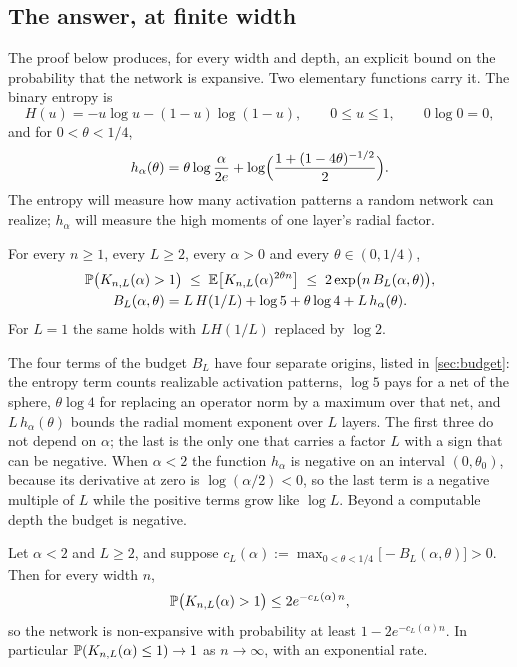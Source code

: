 \subsection{The answer, at finite width}

The proof below produces, for every width and depth, an explicit bound on the probability that the network is expansive. Two elementary functions carry it. The binary entropy is
\[
H(u)=-u\log u-(1-u)\log(1-u),\qquad 0\le u\le 1,\qquad 0\log 0=0,
\]
and for $0<\theta<1/4$,
\begin{equation}\label{eq:hdef}
h_\alpha(\theta)=\theta\log\frac{\alpha}{2e}+\log\Bigl(\frac{1+(1-4\theta)^{-1/2}}{2}\Bigr).
\end{equation}
The entropy will measure how many activation patterns a random network can realize; $h_\alpha$ will measure the high moments of one layer's radial factor.

\begin{theorem}\label{thm:finite}
For every $n\ge 1$, every $L\ge 2$, every $\alpha>0$ and every $\theta\in(0,1/4)$,
\begin{equation}\label{eq:main-finite}
\begin{gathered}
\mathbb{P}\bigl(K_{n,L}(\alpha)>1\bigr)\;\le\;\mathbb{E}\bigl[K_{n,L}(\alpha)^{2\theta n}\bigr]\;\le\;2\exp\bigl(n\,B_L(\alpha,\theta)\bigr),\\
B_L(\alpha,\theta)=L\,H(1/L)+\log 5+\theta\log 4+L\,h_\alpha(\theta).
\end{gathered}
\end{equation}
For $L=1$ the same holds with $L H(1/L)$ replaced by $\log 2$.
\end{theorem}

The four terms of the budget $B_L$ have four separate origins, listed in \cref{sec:budget}: the entropy term counts realizable activation patterns, $\log 5$ pays for a net of the sphere, $\theta\log 4$ for replacing an operator norm by a maximum over that net, and $L\,h_\alpha(\theta)$ bounds the radial moment exponent over $L$ layers. The first three do not depend on $\alpha$; the last is the only one that carries a factor $L$ with a sign that can be negative. When $\alpha<2$ the function $h_\alpha$ is negative on an interval $(0,\theta_0)$, because its derivative at zero is $\log(\alpha/2)<0$, so the last term is a negative multiple of $L$ while the positive terms grow like $\log L$. Beyond a computable depth the budget is negative.

\begin{corollary}\label{cor:width}
Let $\alpha<2$ and $L\ge 2$, and suppose $c_L(\alpha):=\max_{0<\theta<1/4}\bigl[-B_L(\alpha,\theta)\bigr]>0$. Then for every width $n$,
\[
\mathbb{P}\bigl(K_{n,L}(\alpha)>1\bigr)\le 2e^{-c_L(\alpha)\,n},
\]
so the network is non-expansive with probability at least $1-2e^{-c_L(\alpha)n}$. In particular $\mathbb{P}(K_{n,L}(\alpha)\le 1)\to 1$ as $n\to\infty$, with an exponential rate.
\end{corollary}

